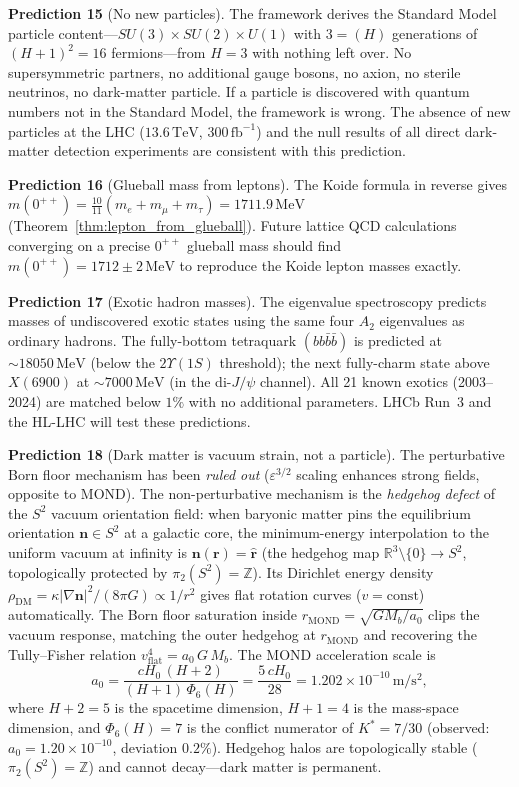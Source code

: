 \documentclass[11pt,a4paper]{article}
\theoremstyle{definition}
\theoremstyle{remark}
\newcommand{\R}{\mathbb{R}}
\newcommand{\Z}{\mathbb{Z}}
\begin{document}
\textbf{Prediction 15} (No new particles). The framework derives the Standard Model particle content---$SU(3)\times SU(2)\times U(1)$ with $3=(H)$ generations of $(H+1)^2=16$ fermions---from $H=3$ with nothing left over. No supersymmetric partners, no additional gauge bosons, no axion, no sterile neutrinos, no dark-matter particle. If a particle is discovered with quantum numbers not in the Standard Model, the framework is wrong. The absence of new particles at the LHC ($13.6\,\mathrm{TeV}$, $300\,\mathrm{fb}^{-1}$) and the null results of all direct dark-matter detection experiments are consistent with this prediction.

\textbf{Prediction 16} (Glueball mass from leptons). The Koide formula in reverse gives $m(0^{++})=\tfrac{10}{11}(m_e+m_\mu+m_\tau)=1711.9\,\mathrm{MeV}$ (Theorem~\ref{thm:lepton_from_glueball}). Future lattice QCD calculations converging on a precise $0^{++}$ glueball mass should find $m(0^{++})=1712\pm 2\,\mathrm{MeV}$ to reproduce the Koide lepton masses exactly.

\textbf{Prediction 17} (Exotic hadron masses). The eigenvalue spectroscopy predicts masses of undiscovered exotic states using the same four $A_2$ eigenvalues as ordinary hadrons. The fully-bottom tetraquark $(bb\bar{b}\bar{b})$ is predicted at $\sim\!18050\,\mathrm{MeV}$ (below the $2\Upsilon(1S)$ threshold); the next fully-charm state above $X(6900)$ at $\sim\!7000\,\mathrm{MeV}$ (in the di-$J/\psi$ channel). All 21 known exotics (2003--2024) are matched below $1\%$ with no additional parameters. LHCb Run~3 and the HL-LHC will test these predictions.

\textbf{Prediction 18} (Dark matter is vacuum strain, not a particle). The perturbative Born floor mechanism has been \emph{ruled out} ($\varepsilon^{3/2}$ scaling enhances strong fields, opposite to MOND). The non-perturbative mechanism is the \emph{hedgehog defect} of the $S^2$ vacuum orientation field: when baryonic matter pins the equilibrium orientation $\mathbf{n}\in S^2$ at a galactic core, the minimum-energy interpolation to the uniform vacuum at infinity is $\mathbf{n}(\mathbf{r})=\hat{\mathbf{r}}$ (the hedgehog map $\R^3\!\setminus\!\{0\}\to S^2$, topologically protected by $\pi_2(S^2)=\Z$). Its Dirichlet energy density $\rho_{\mathrm{DM}}=\kappa|\nabla\mathbf{n}|^2/(8\pi G)\propto 1/r^2$ gives flat rotation curves ($v=\mathrm{const}$) automatically. The Born floor saturation inside $r_{\mathrm{MOND}}=\sqrt{GM_b/a_0}$ clips the vacuum response, matching the outer hedgehog at $r_{\mathrm{MOND}}$ and recovering the Tully--Fisher relation $v_{\mathrm{flat}}^4=a_0\,G\,M_b$. The MOND acceleration scale is
\begin{equation}\label{eq:mond_a0}
a_0 = \frac{cH_0\,(H+2)}{(H+1)\,\Phi_6(H)} = \frac{5\,cH_0}{28} = 1.202\times 10^{-10}\,\mathrm{m/s^2},
\end{equation}
where $H+2=5$ is the spacetime dimension, $H+1=4$ is the mass-space dimension, and $\Phi_6(H)=7$ is the conflict numerator of $K^*=7/30$ (observed: $a_0=1.20\times 10^{-10}$, deviation $0.2\%$). Hedgehog halos are topologically stable ($\pi_2(S^2)=\Z$) and cannot decay---dark matter is permanent.
\end{document}
